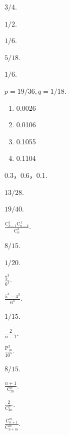 \begin{answer}
  \item $3/4$.
  \item $1/2$.
  \item \begin{enumerate*}
    \item $1/6$.
    \item $5/18$.
    \item $1/6$.
  \end{enumerate*}
  \item $p=19/36,q=1/18$.
  \item \begin{enumerate}
    \item 0.0026
    \item 0.0106
    \item 0.1055
    \item 0.1104
  \end{enumerate}
  \item 0.3，0.6，0.1.
  \item $13/28$.
  \item $19/40$.
  \item $\frac{\mathrm C_{k-1}^1\mathrm C_{n-k}^1}{\mathrm C_n^2}$.
  \item \begin{enumerate*}
    \item $8/15$.
    \item $1/20$.
  \end{enumerate*}

  \item \begin{enumerate*}
    \item $\frac{5^3}{6^3}$.
    \item $\frac{5^3-4^3}{6^3}$.
  \end{enumerate*}

  \item $1/15$.

  \item $\frac2{n-1}$.

  \item $\frac{\mathrm P_{10}^5}{10^5}$.

  \item $8/15$.

  \item $\frac{n+1}{\mathrm C_{2n}^n}$.

  \item $\frac2{\mathrm C_{2n}^n}$.

  \item $\frac{\mathrm C_{n+1}^m}{\mathrm C_{n+m}^m}$.


\end{answer}

